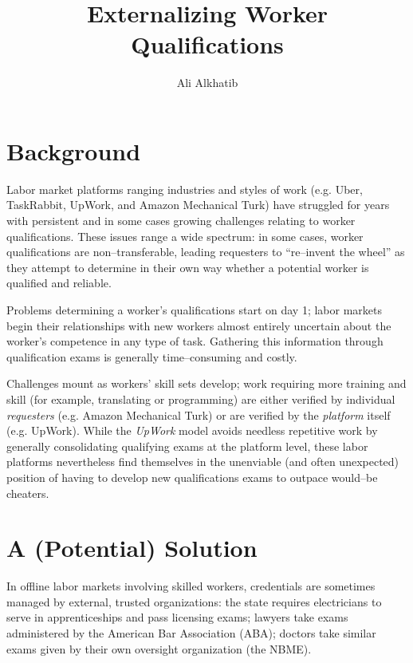 \documentclass[11pt]{article}
\title{Externalizing Worker Qualifications}
\author{Ali Alkhatib}
\makeatletter
\renewcommand{\maketitle}{\bgroup\setlength{\parindent}{0pt}
\begin{flushleft}
  \textbf{\LARGE{\@title}}

  \@author
\end{flushleft}\egroup
}
\makeatother
\begin{document}
\maketitle{}

\section*{Background}
Labor market platforms ranging industries and styles of work
(e.g. Uber, TaskRabbit, UpWork, and Amazon Mechanical Turk)
have struggled for years with persistent and
in some cases growing
challenges relating to worker qualifications.
These issues range a wide spectrum:
in some cases, worker qualifications are non--transferable,
leading requesters to ``re--invent the wheel'' as they attempt to determine
in their own way whether a potential worker is qualified and reliable.

Problems determining a worker's qualifications start on day 1;
labor markets begin their relationships with new workers
almost entirely uncertain about the worker's competence in any type of task.
Gathering this information through qualification exams is generally
time--consuming and costly.

Challenges mount as workers' skill sets develop;
work requiring more training and skill (for example, translating or programming)
are either verified by individual \textit{requesters} (e.g. Amazon Mechanical Turk)
or are verified by the \textit{platform} itself (e.g. UpWork).
While the \textit{UpWork} model avoids needless repetitive work by
generally consolidating qualifying exams at the platform level,
these labor platforms nevertheless find themselves in the unenviable
(and often unexpected) position of
having to develop new qualifications exams to outpace would--be cheaters.





\section*{A (Potential) Solution}
In offline labor markets involving skilled workers,
credentials are sometimes managed by
external, trusted organizations:
the state requires electricians
to serve in apprenticeships and
pass licensing exams;
lawyers take exams administered by the American Bar Association (ABA);
doctors take similar exams given by their own oversight organization (the NBME).
\end{document}
